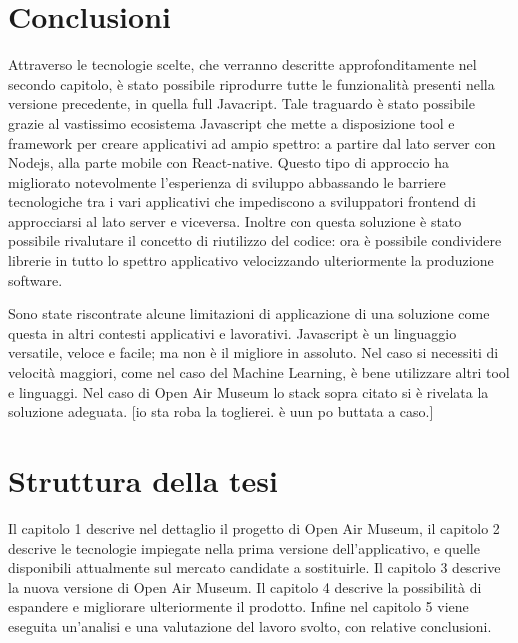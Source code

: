 \section{Conclusioni}\vspace{5mm}

Attraverso le tecnologie scelte, che verranno descritte approfonditamente nel secondo capitolo, è stato possibile riprodurre tutte le funzionalità presenti nella versione precedente, in quella full Javacript. Tale traguardo è stato possibile grazie al vastissimo ecosistema Javascript che mette a disposizione tool e framework per creare applicativi ad ampio spettro: a partire dal lato server con Nodejs, alla parte mobile con React-native. Questo tipo di approccio ha migliorato notevolmente l'esperienza di sviluppo abbassando le barriere tecnologiche tra i vari applicativi che impediscono a sviluppatori frontend di approcciarsi al lato server e viceversa. Inoltre con questa soluzione è stato possibile rivalutare il concetto di riutilizzo del codice: ora è possibile condividere librerie in tutto lo spettro applicativo velocizzando ulteriormente la produzione software.\vspace{5mm}

Sono state riscontrate alcune limitazioni di applicazione di una soluzione come questa in altri contesti applicativi e lavorativi. Javascript è un linguaggio versatile, veloce e facile; ma non è il migliore in assoluto. Nel caso si necessiti di velocità maggiori, come nel caso del Machine Learning, è bene utilizzare altri tool e linguaggi. Nel caso di Open Air Museum lo stack sopra citato si è rivelata la soluzione adeguata. [io sta roba la toglierei. è uun po buttata a caso.]
	
\section{Struttura della tesi}\vspace{5mm}
	
Il capitolo 1 descrive nel dettaglio il progetto di Open Air Museum, il capitolo 2 descrive le tecnologie impiegate nella prima versione dell'applicativo, e quelle disponibili attualmente sul mercato candidate a sostituirle. Il capitolo 3 descrive la nuova versione di Open Air Museum. Il capitolo 4 descrive la possibilità di espandere e migliorare ulteriormente il prodotto. Infine nel capitolo 5 viene eseguita un’analisi e una valutazione del lavoro svolto, con relative conclusioni. 



